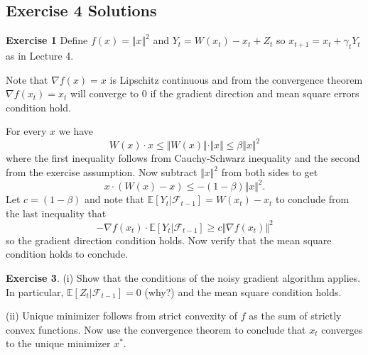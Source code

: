 \documentclass[letter,11pt]{article}
\begin{document}
   \subsection{Exercise 4 Solutions}



\textbf{Exercise 1}
  Define $f(x) = \Vert x \Vert ^{2}$ and $Y_{t} = W(x_{t}) - x_{t} + Z_{t}$ so $x_{t+1} = x_{t} + \gamma_{t}Y_{t}$ as in Lecture 4. 

  Note that $\nabla f(x) = x$ is Lipschitz continuous and from the convergence theorem $\nabla f(x_{t}) = x_{t}$ will converge to $0$ if the gradient direction and mean square errors condition hold. 
  
  For every $x$ we have 
  $$ W(x) \cdot x \leq \Vert W(x) \Vert \cdot \Vert x \Vert \leq \beta  \Vert x \Vert ^{2}$$
  where the first inequality follows from Cauchy-Schwarz inequality and the second from the exercise assumption.  Now subtract $\Vert x \Vert ^{2}$ from both sides to get 
  $$ x \cdot (W(x) - x) \leq - (1-\beta)\Vert x \Vert ^{2}. $$
  Let $c= (1-\beta)$ and note that $\mathbb{E}[ Y_{t}  | \mathcal{F}_{t-1} ] = W(x_{t}) - x_{t}$ to conclude from the last inequality that 
  $$- \nabla f(x_{t}) \cdot  \mathbb{E}[ Y_{t}  | \mathcal{F}_{t-1} ]  \geq c \Vert \nabla f(x_{t}) \Vert ^{2} $$
  so the gradient direction condition holds. Now verify that the mean square condition holds to conclude. 


  \textbf{Exercise 3}. 
    (i) Show that the conditions of the noisy gradient algorithm applies. In particular, $\mathbb{E}[ Z_{t}  | \mathcal{F}_{t-1} ] = 0$ (why?) and the mean square condition holds. 

    (ii) Unique minimizer follows from strict convexity of $f$ as the sum of strictly convex functions. Now use the convergence theorem to conclude that $x_{t}$ converges to the unique minimizer $x^{*}$. 
\end{document}
